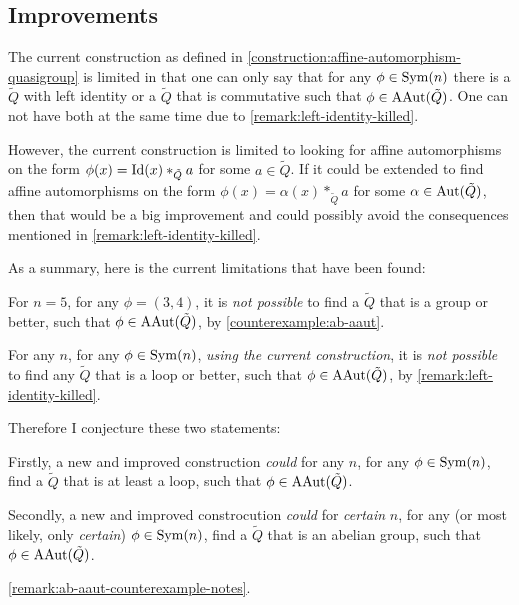 \subsection{Improvements}

\begin{idea} \label{idea:improved-construction}
    The current construction as defined in \autoref{construction:affine-automorphism-quasigroup} is limited in that one can only say that for any \( \phi \in \operatorname{Sym}(n) \) there is a \( \tilde{Q} \) with left identity or a \( \tilde{Q} \) that is commutative such that \( \phi \in \operatorname{AAut}(\tilde{Q}) \). One can not have both at the same time due to \autoref{remark:left-identity-killed}.

    However, the current construction is limited to looking for affine automorphisms on the form \( \phi(x) = \operatorname{Id}(x) *_{\tilde{Q}} a \) for some \( a \in \tilde{Q} \). If it could be extended to find affine automorphisms on the form \( \phi(x) = \alpha(x) *_{\tilde{Q}} a \) for some \( \alpha \in \operatorname{Aut}(\tilde{Q}) \), then that would be a big improvement and could possibly avoid the consequences mentioned in \autoref{remark:left-identity-killed}.

    As a summary, here is the current limitations that have been found:

    For \( n = 5 \), for any \( \phi = (3, 4) \), it is \emph{not possible} to find a \( \tilde{Q} \) that is a group or better, such that \( \phi \in \operatorname{AAut}(\tilde{Q}) \), by \autoref{counterexample:ab-aaut}.

    For any \( n \), for any \( \phi \in \operatorname{Sym}(n) \), \emph{using the current construction}, it is \emph{not possible} to find any \( \tilde{Q} \) that is a loop or better, such that \( \phi \in \operatorname{AAut}(\tilde{Q}) \), by \autoref{remark:left-identity-killed}.

    Therefore I conjecture these two statements:

    Firstly, a new and improved construction \emph{could} for any \( n \), for any \( \phi \in \operatorname{Sym}(n) \), find a \( \tilde{Q} \) that is at least a loop, such that \( \phi \in \operatorname{AAut}(\tilde{Q}) \).

    Secondly, a new and improved constrocution \emph{could} for \emph{certain} \( n \), for any (or most likely, only \emph{certain}) \( \phi \in \operatorname{Sym}(n) \), find a \( \tilde{Q} \) that is an abelian group, such that \( \phi \in \operatorname{AAut}(\tilde{Q}) \).
\end{idea}

\begin{idea}
    \autoref{remark:ab-aaut-counterexample-notes}.
\end{idea}

